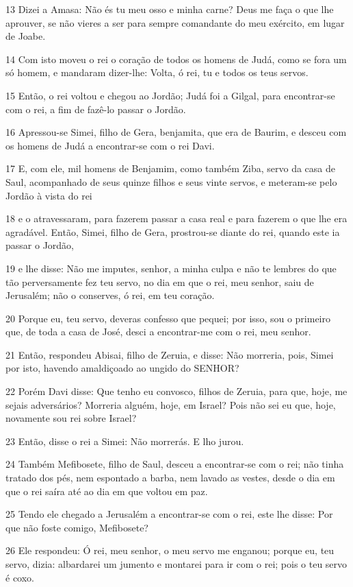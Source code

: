 \par 13 Dizei a Amasa: Não és tu meu osso e minha carne? Deus me faça o que lhe aprouver, se não vieres a ser para sempre comandante do meu exército, em lugar de Joabe.
\par 14 Com isto moveu o rei o coração de todos os homens de Judá, como se fora um só homem, e mandaram dizer-lhe: Volta, ó rei, tu e todos os teus servos.
\par 15 Então, o rei voltou e chegou ao Jordão; Judá foi a Gilgal, para encontrar-se com o rei, a fim de fazê-lo passar o Jordão.
\par 16 Apressou-se Simei, filho de Gera, benjamita, que era de Baurim, e desceu com os homens de Judá a encontrar-se com o rei Davi.
\par 17 E, com ele, mil homens de Benjamim, como também Ziba, servo da casa de Saul, acompanhado de seus quinze filhos e seus vinte servos, e meteram-se pelo Jordão à vista do rei
\par 18 e o atravessaram, para fazerem passar a casa real e para fazerem o que lhe era agradável. Então, Simei, filho de Gera, prostrou-se diante do rei, quando este ia passar o Jordão,
\par 19 e lhe disse: Não me imputes, senhor, a minha culpa e não te lembres do que tão perversamente fez teu servo, no dia em que o rei, meu senhor, saiu de Jerusalém; não o conserves, ó rei, em teu coração.
\par 20 Porque eu, teu servo, deveras confesso que pequei; por isso, sou o primeiro que, de toda a casa de José, desci a encontrar-me com o rei, meu senhor.
\par 21 Então, respondeu Abisai, filho de Zeruia, e disse: Não morreria, pois, Simei por isto, havendo amaldiçoado ao ungido do SENHOR?
\par 22 Porém Davi disse: Que tenho eu convosco, filhos de Zeruia, para que, hoje, me sejais adversários? Morreria alguém, hoje, em Israel? Pois não sei eu que, hoje, novamente sou rei sobre Israel?
\par 23 Então, disse o rei a Simei: Não morrerás. E lho jurou.
\par 24 Também Mefibosete, filho de Saul, desceu a encontrar-se com o rei; não tinha tratado dos pés, nem espontado a barba, nem lavado as vestes, desde o dia em que o rei saíra até ao dia em que voltou em paz.
\par 25 Tendo ele chegado a Jerusalém a encontrar-se com o rei, este lhe disse: Por que não foste comigo, Mefibosete?
\par 26 Ele respondeu: Ó rei, meu senhor, o meu servo me enganou; porque eu, teu servo, dizia: albardarei um jumento e montarei para ir com o rei; pois o teu servo é coxo.
